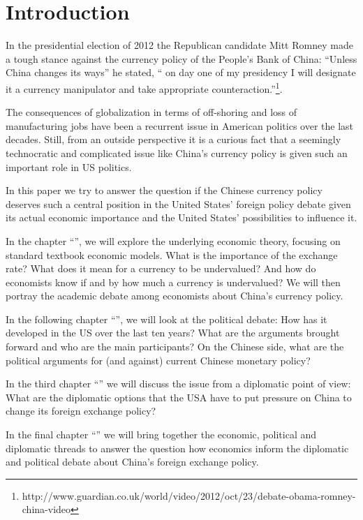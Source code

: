 \section{Introduction}
\label{sec:introduction}

In the presidential election of 2012 the Republican candidate Mitt 
Romney made a tough stance against the currency policy of the People's 
Bank of China: ``Unless China changes its ways'' he stated, `` on day 
one of my presidency I will designate it a currency manipulator and take 
appropriate 
counteraction.''\footnote{http://www.guardian.co.uk/world/video/2012/oct/23/debate-obama-romney-china-video}.

The consequences of globalization in terms of off-shoring and loss of 
manufacturing jobs have been a recurrent issue in American politics over 
the last decades. Still, from an outside perspective it is a 
curious fact that a seemingly technocratic and complicated issue like 
China's currency policy is given such an important role in US politics.  

In this paper we try to answer the question if the Chinese currency 
policy deserves such a central position in the United States' foreign 
policy debate given its actual economic importance and the United 
States' possibilities to influence it.


In the chapter ``'', we will explore the 
underlying economic theory, focusing on standard textbook economic 
models.  What is the importance of the exchange rate?  What does it mean 
for a currency to be undervalued? And how do economists know if and by 
how much a currency is undervalued? We will then portray the academic 
debate among economists about China's currency policy. 

In the following chapter ``'', we will look at the 
political debate: How has it developed in the US over the last ten 
years?  What are the arguments brought forward and who are the main 
participants? On the Chinese side, what are the political arguments for 
(and against) current Chinese monetary policy?  

In the third chapter ``'' we will discuss the 
issue from a diplomatic point of view: What are the diplomatic options 
that the USA have to put pressure on China to change its foreign 
exchange policy? 

In the final chapter ``'' we will bring together 
the economic, political and diplomatic threads to answer the question 
how economics inform the diplomatic and political debate about China's 
foreign exchange policy. 

